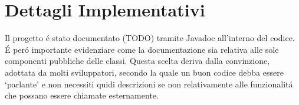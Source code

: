 \section{Dettagli Implementativi}



Il progetto \'e stato documentato (TODO) tramite Javadoc all'interno del codice. \'E per\'o importante evidenziare come la documentazione sia relativa alle sole componenti pubbliche delle classi. Questa scelta deriva dalla convinzione, adottata da molti sviluppatori, secondo la quale un buon codice debba essere `parlante' e non necessiti quidi descrizioni se non relativamente alle funzionalit\'a che possano essere chiamate esternamente.

